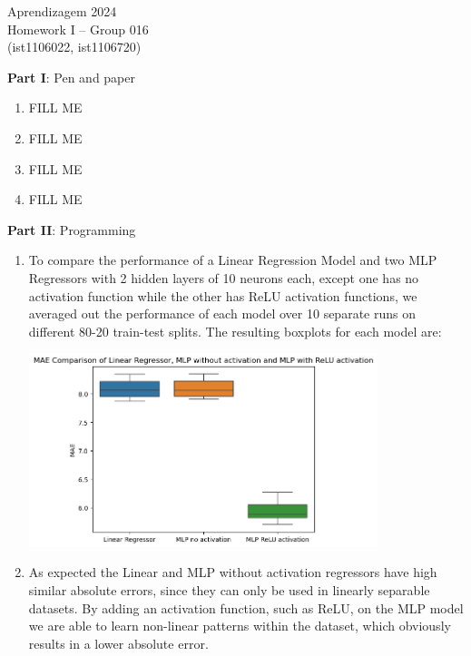 \documentclass[12pt]{article}
\begin{document}
\center
Aprendizagem 2024\\
Homework I -- Group 016\\
(ist1106022, ist1106720)\vskip 1cm

\large{\textbf{Part I}: Pen and paper}\normalsize
\begin{enumerate}[leftmargin=\labelsep, label=\textbf{\arabic*.)}]
    \item FILL ME
    \item FILL ME
    \item FILL ME
    \item FILL ME
\end{enumerate}


\large{\textbf{Part II}: Programming}\normalsize
\begin{enumerate}[leftmargin=\labelsep, label=\textbf{\arabic*.)},start=5]
    \item To compare the performance of a Linear Regression Model and two MLP Regressors with 2 hidden layers of 10 neurons each, except one has no activation function while the other has ReLU activation functions, we averaged out the performance of each model over 10 separate runs on different 80-20 train-test splits. The resulting boxplots for each model are:

          \begin{center}
              \includegraphics[width=0.8\textwidth]{boxplot_models_MAE.png}
          \end{center}

    \item As expected the Linear and MLP without activation regressors have high similar absolute errors, since they can only be used in linearly separable datasets. By adding an activation function, such as ReLU, on the MLP model we are able to learn non-linear patterns within the dataset, which obviously results in a lower absolute error.


\end{enumerate}
\end{document}
